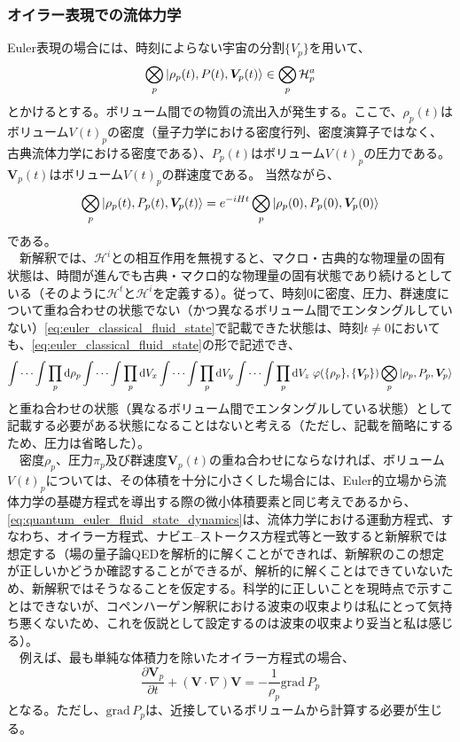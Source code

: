 \subsubsection{オイラー表現での流体力学}
Euler表現の場合には、時刻によらない宇宙の分割$\{V_p\}$を用いて、
\begin{equation}
    \label{eq:euler_classical_fluid_state}
    \bigotimes_p \ket{\rho_p(t),P(t),\bm{V}_p(t)} \in \bigotimes_p \mathcal{H}_p^a
\end{equation}
とかけるとする。ボリューム間での物質の流出入が発生する。ここで、$\rho_p(t)$はボリューム$V(t)_p$の密度（量子力学における密度行列、密度演算子ではなく、古典流体力学における密度である）、$P_p(t)$はボリューム$V(t)_p$の圧力である。$\bm{V}_p(t)$はボリューム$V(t)_p$の群速度である。
当然ながら、
\begin{equation}
    \label{eq:quantum_euler_fluid_state_dynamics}
    \bigotimes_p \ket{\rho_p(t),P_p(t),\bm{V}_p(t)} = e^{-iHt}\bigotimes_p \ket{\rho_p(0),P_p(0),\bm{V}_p(0)}
\end{equation}
である。\\
　新解釈では、$\mathcal{H}^i$との相互作用を無視すると、マクロ・古典的な物理量の固有状態は、時間が進んでも古典・マクロ的な物理量の固有状態であり続けるとしている（そのように$\mathcal{H}^t$と$\mathcal{H}^i$を定義する）。従って、時刻$0$に密度、圧力、群速度について重ね合わせの状態でない（かつ異なるボリューム間でエンタングルしていない）\eqref{eq:euler_classical_fluid_state}で記載できた状態は、時刻$t \neq 0$においても、\eqref{eq:euler_classical_fluid_state}の形で記述でき、
\begin{equation}
   \int \cdots \int \prod_p \mathrm{d}\rho_p
   \int \cdots \int \prod_p \mathrm{d}V_x \int \cdots \int \prod_p \mathrm{d}V_y \int \cdots \int \prod_p \mathrm{d}V_z \; \varphi(\{\rho_p\},\{\bm{V}_p\}) \bigotimes_p \ket{\rho_p,P_p,\bm{V}_p}
\end{equation}
と重ね合わせの状態（異なるボリューム間でエンタングルしている状態）として記載する必要がある状態になることはないと考える（ただし、記載を簡略にするため、圧力は省略した）。\\
　密度$\rho_p$、圧力$\pi_p$及び群速度$\bm{V}_p(t)$の重ね合わせにならなければ、ボリューム$V(t)_p$については、その体積を十分に小さくした場合には、Euler的立場から流体力学の基礎方程式を導出する際の微小体積要素と同じ考えであるから、\eqref{eq:quantum_euler_fluid_state_dynamics}は、流体力学における運動方程式、すなわち、オイラー方程式、ナビエ–ストークス方程式等と一致すると新解釈では想定する（場の量子論QEDを解析的に解くことができれば、新解釈のこの想定が正しいかどうか確認することができるが、解析的に解くことはできていないため、新解釈ではそうなることを仮定する。科学的に正しいことを現時点で示すことはできないが、コペンハーゲン解釈における波束の収束よりは私にとって気持ち悪くないため、これを仮説として設定するのは波束の収束より妥当と私は感じる）。\\
　例えば、最も単純な体積力を除いたオイラー方程式の場合、
\begin{equation}
    \frac{\partial{\bm{V}_p}}{\partial t} + (\bm{V}\cdot \nabla) \bm{V} = -\frac{1}{\rho_p } \mathrm{grad}\, P_p
\end{equation}
となる。ただし、$\mathrm{grad}\,P_p$は、近接しているボリュームから計算する必要が生じる。
